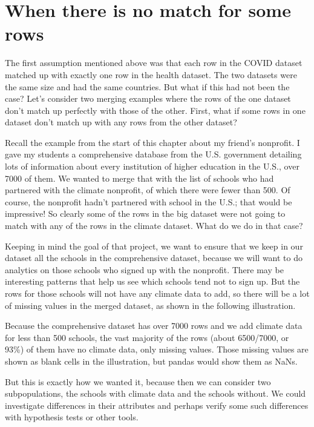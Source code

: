 \documentclass[letterpaper,10pt,english]{jupyterBook}
\begin{document}
\section{When there is no match for some rows}
\label{\detokenize{chapter-12-concat-and-merge:when-there-is-no-match-for-some-rows}}
\sphinxAtStartPar
The first assumption mentioned above was that each row in the COVID dataset matched up with exactly one row in the health dataset.  The two datasets were the same size and had the same countries.  But what if this had not been the case?  Let’s consider two merging examples where the rows of the one dataset don’t match up perfectly with those of the other.  First, what if some rows in one dataset don’t match up with any rows from the other dataset?

\sphinxAtStartPar
Recall the example from the start of this chapter about my friend’s nonprofit.  I gave my students a comprehensive database from the U.S. government detailing lots of information about every institution of higher education in the U.S., over 7000 of them.  We wanted to merge that with the list of schools who had partnered with the climate nonprofit, of which there were fewer than 500.  Of course, the nonprofit hadn’t partnered with  school in the U.S.; that would be impressive!  So clearly some of the rows in the big dataset were not going to match with any of the rows in the climate dataset.  What do we do in that case?

\sphinxAtStartPar
Keeping in mind the goal of that project, we want to ensure that we keep in our dataset all the schools in the comprehensive dataset, because we will want to do analytics on those schools who  signed up with the nonprofit.  There may be interesting patterns that help us see which schools tend not to sign up.  But the rows for those schools will not have any climate data to add, so there will be a lot of missing values in the merged dataset, as shown in the following illustration.

\sphinxAtStartPar
{}

\sphinxAtStartPar
Because the comprehensive dataset has over 7000 rows and we add climate data for less than 500 schools, the vast majority of the rows (about 6500/7000, or 93\%) of them have no climate data, only missing values.  Those missing values are shown as blank cells in the illustration, but pandas would show them as NaNs.

\sphinxAtStartPar
But this is exactly how we wanted it, because then we can consider two subpopulations, the schools with climate data and the schools without.  We could investigate differences in their attributes and perhaps verify some such differences with hypothesis tests or other tools.
\end{document}

